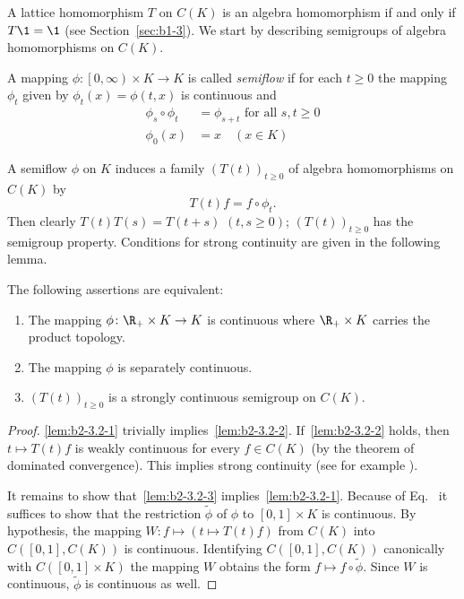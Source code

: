 A lattice homomorphism $T$ on $C(K)$ is an algebra homomorphism if and only if\/ $T \1 = \1$ (see Section~\ref{sec:b1-3}).
We start by describing semigroups of algebra homomor\-phisms on $C(K)$.
\begin{definition}\label{def:b2-3.1}
A mapping $\phi \colon \left[0,\infty\right) \times K \to K$ is called \emph{semiflow} if for each $t \geq 0$ the mapping $\phi_{t}$ given by $\phi_{t}(x) = \phi(t,x)$ is continuous and
\begin{align}
\phi_{s} \circ \phi_{t} &= \phi_{s+t} \text{ for all } s,t \geq 0 \label{eq:b2-3.1} \\
\phi_{0}(x) &= x \quad (x \in K) \label{eq:b2-3.2}
\end{align}
\end{definition}
A semiflow $\phi$ on $K$ induces a family $(T(t))_{t \geq 0}$ of algebra homomorphisms on $C(K)$ by
\begin{equation}\label{eq:b2-3.3}
T(t)f = f \circ \phi_{t}.
\end{equation}
Then clearly $T(t)T(s) = T(t+s)$ $(t,s\geq 0)$; \ie  $(T(t))_{t \geq 0}$ has the
semigroup property.
Conditions for strong continuity are given in the following lemma.
\begin{lemma}\label{lem:b2-3.2}
The following assertions are equivalent:
\begin{enumerate}[\upshape (a)]
\item \label{lem:b2-3.2-1}
The mapping $\phi \colon \R_{+} \times K \to K$ is continuous where $\R_{+} \times K$ carries the product topology.
\item \label{lem:b2-3.2-2}
The mapping $\phi$ is separately continuous.
\item \label{lem:b2-3.2-3}
$(T(t))_{t \geq 0}$ is a strongly continuous semigroup on $C(K)$.
\end{enumerate}
\end{lemma}
\begin{proof}
\ref{lem:b2-3.2-1} trivially implies~\ref{lem:b2-3.2-2}.
If~\ref{lem:b2-3.2-2} holds, then $t \mapsto T(t)f$ is weakly continuous for every $f \in C(K)$ (by the theorem of dominated convergence).
This implies strong continuity (see for example \textcite[Proposition 1.23]{davies:1980}).

It remains to show that~\ref{lem:b2-3.2-3} implies~\ref{lem:b2-3.2-1}.
Because of Eq.~ it suffices to show that the restriction $\widetilde{\phi}$ of\/ $\phi$ to $[0,1] \times K$ is continuous.
By hypothesis, the mapping $W \colon f \mapsto (t \mapsto T(t)f)$ from $C(K)$ into $C([0,1],C(K))$ is continuous.
Identifying $C([0,1],C(K))$ canonically with $C([0,1] \times K)$ the mapping $W$ obtains the form $f \mapsto f \circ \widetilde{\phi}$.
Since $W$ is continuous, $\widetilde{\phi}$ is continuous as well.
\end{proof}
